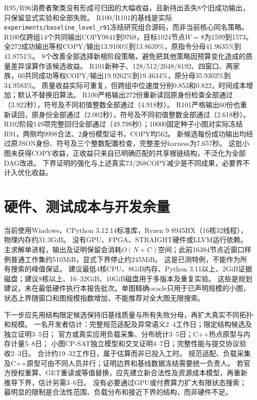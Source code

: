 \documentclass[UTF8,11pt,a4paper]{ctexart}
\begin{document}
R95/R96消费者聚类没有形成可归因的大幅收益，且新持出丢失8个旧成功输出，只保留显式实验和全部失败。
R100/R101的基线是实际\texttt{experiments/baseline\_level\_r91}冻结研究组合源码，而非当前核心同名策略。
R100仅跨组14个共同输出COPY9841到9768，目标1024节点$W=8$为1599到1573。
全272成功输出等权COPY/输出13.9100\%到13.8639\%，原指令分母41.9635\%到41.8751\%。
8个改善全部选择新根阶段策略，避免把其他策略因预算变化造成的质量差异误算作该候选收益。
R101新种子、128/512/2048/8192、四窗口、两家族，60共同成功等权COPY/输出19.9262\%到19.4634\%，原分母35.9302\%到34.9583\%。
质量收益实际可重复，但跨组中位速度分别0.853和0.822，时间成本增加；默认不替换旧算法。
R100严格输出272份重新读回原身份检查全部通过（3.922秒），符号及不同初值整数全部通过（4.918秒）。
R101严格输出60份也重新读回，原身份全部通过（2.002秒），符号及不同初值整数全部通过（2.618秒）。
R102阶段149项完整回归全部通过（49.798秒）；10000固定种子小图对实际冻结R91，两侧均9998合法、2身份模型证书，COPY均562。
新候选每份成功输出均经过原JSON身份、符号及三个整数配置检查，完整差分harness为7.657秒。
这批小图未获得COPY收益，正收益只来自已明确匹配的共享根链结构，不泛化为全部DAG改进。
下界证明的强化与上述真实73/268COPY减少是不同成果，必要界不计入优化收益。

\section{硬件、测试成本与开发余量}
当前使用Windows、CPython 3.12.14标准库，Ryzen 9 8945HX（16核32线程），物理内存约31.3GiB。
没有GPU、FPGA、STRAIGHT硬件或LLVM运行依赖。
主求解单进程，输出及证明保留会消耗$O(N+C)$空间；此前16384节点近窗口样例普通工作集约510MiB，显式下界停止约245MiB。
这是已测特例，不能作为所有搜索的峰值保证。
建议最低4核CPU、8GiB内存、Python 3.11以上、2GiB证据磁盘；建议8核以上、16--32GiB、10GiB磁盘用于多版本及重复实验。
这些是规划建议，未在最低硬件执行本报告批次。单图精确oracle只用于已声明规模的小图，状态上界随窗口和图规模指数增加，不能推荐对全大图无限搜索。

下一步应先用结构限定候选保持旧基线质量与所有失败分母，再扩大真实不同拓扑和规模。
一名开发者估计：完整规范适配及异常语义2--4工作日；限定结构候选及独立证明3--5日；
官方或真实应用负载采集、分布统计3--5日；C++热点原型与内存计量5--8日；
小图CP-SAT独立模型和交叉证明4--7日；完整性能与提交协议验收2--3日。
合计约19--32工作日，属于估算而非已投入工时。
规范适配、负载采集及C++原型可由不同人员并行；证明边界和基线数据冻结需要统一负责人。
若官方授权重算、GET重读或等值替换，应先建立新合法性及资源成本模型，再重新推导下界，估计另需3--6日。
没有必要通过GPU或付费算力扩大有限状态搜索；最明显的限制是合法性范围、负载分布和接近下界的结构，而非硬件不足。
\end{document}
